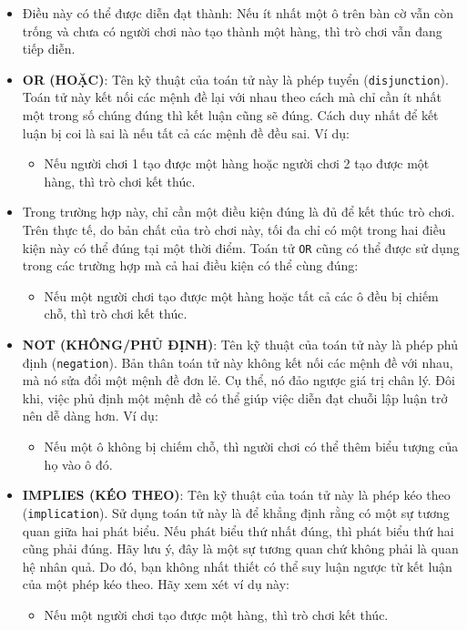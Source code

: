 \begin{itemize}
    \item Điều này có thể được diễn đạt thành: Nếu ít nhất một ô trên bàn cờ vẫn còn trống và chưa có người chơi nào tạo thành một hàng, thì trò chơi vẫn đang tiếp diễn.

    \item \textbf{OR (HOẶC)}: Tên kỹ thuật của toán tử này là phép tuyển (\texttt{disjunction}). Toán tử này kết nối các mệnh đề lại với nhau theo cách mà chỉ cần ít nhất một trong số chúng đúng thì kết luận cũng sẽ đúng. Cách duy nhất để kết luận bị coi là sai là nếu tất cả các mệnh đề đều sai. Ví dụ:
    \begin{itemize}
        \item Nếu người chơi 1 tạo được một hàng hoặc người chơi 2 tạo được một hàng, thì trò chơi kết thúc.
    \end{itemize}

    \item Trong trường hợp này, chỉ cần một điều kiện đúng là đủ để kết thúc trò chơi. Trên thực tế, do bản chất của trò chơi này, tối đa chỉ có một trong hai điều kiện này có thể đúng tại một thời điểm. Toán tử \texttt{OR} cũng có thể được sử dụng trong các trường hợp mà cả hai điều kiện có thể cùng đúng:
    \begin{itemize}
        \item Nếu một người chơi tạo được một hàng hoặc tất cả các ô đều bị chiếm chỗ, thì trò chơi kết thúc.
    \end{itemize}

    \item \textbf{NOT (KHÔNG/PHỦ ĐỊNH)}: Tên kỹ thuật của toán tử này là phép phủ định (\texttt{negation}). Bản thân toán tử này không kết nối các mệnh đề với nhau, mà nó sửa đổi một mệnh đề đơn lẻ. Cụ thể, nó đảo ngược giá trị chân lý. Đôi khi, việc phủ định một mệnh đề có thể giúp việc diễn đạt chuỗi lập luận trở nên dễ dàng hơn. Ví dụ:
    \begin{itemize}
        \item Nếu một ô không bị chiếm chỗ, thì người chơi có thể thêm biểu tượng của họ vào ô đó.
    \end{itemize}

    \item \textbf{IMPLIES (KÉO THEO)}: Tên kỹ thuật của toán tử này là phép kéo theo (\texttt{implication}). Sử dụng toán tử này là để khẳng định rằng có một sự tương quan giữa hai phát biểu. Nếu phát biểu thứ nhất đúng, thì phát biểu thứ hai cũng phải đúng. Hãy lưu ý, đây là một sự tương quan chứ không phải là quan hệ nhân quả. Do đó, bạn không nhất thiết có thể suy luận ngược từ kết luận của một phép kéo theo. Hãy xem xét ví dụ này:
    \begin{itemize}
        \item Nếu một người chơi tạo được một hàng, thì trò chơi kết thúc.
    \end{itemize}


\end{itemize}
